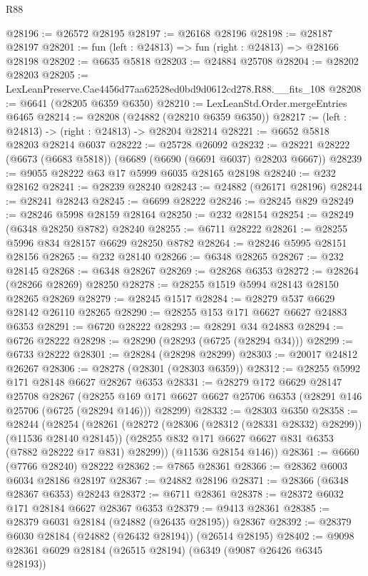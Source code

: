 \begin{lexlean}{R88}
\begin{coremodule}
@28196 := @26572 @28195
@28197 := @26168 @28196
@28198 := @28187 @28197
@28201 := fun (left : @24813) => fun (right : @24813) => @28166 @28198
@28202 := @6635 @5818
@28203 := @24884 @25708
@28204 := @28202 @28203
@28205 := LexLeanPreserve.Cae4456d77aa62528ed0bd9d0612cd278.R88.__fits_108
@28208 := @6641 (@28205 @6359 @6350)
@28210 := LexLeanStd.Order.mergeEntries @6465
@28214 := @28208 (@24882 (@28210 @6359 @6350))
@28217 := (left : @24813) -> (right : @24813) -> @28204 @28214
@28221 := @6652 @5818 @28203 @28214 @6037
@28222 := @25728 @26092
@28232 := @28221 @28222 (@6673 (@6683 @5818)) (@6689 (@6690 (@6691 @6037) @28203 @6667))
@28239 := @9055 @28222 @63 @17 @5999 @6035 @28165 @28198
@28240 := @232 @28162
@28241 := @28239 @28240
@28243 := @24882 (@26171 @28196)
@28244 := @28241 @28243
@28245 := @6699 @28222
@28246 := @28245 @829
@28249 := @28246 @5998 @28159 @28164
@28250 := @232 @28154
@28254 := @28249 (@6348 @28250 @8782) @28240
@28255 := @6711 @28222
@28261 := @28255 @5996 @834 @28157 @6629 @28250 @8782
@28264 := @28246 @5995 @28151 @28156
@28265 := @232 @28140
@28266 := @6348 @28265
@28267 := @232 @28145
@28268 := @6348 @28267
@28269 := @28268 @6353
@28272 := @28264 (@28266 @28269) @28250
@28278 := @28255 @1519 @5994 @28143 @28150 @28265 @28269
@28279 := @28245 @1517
@28284 := @28279 @537 @6629 @28142 @26110 @28265
@28290 := @28255 @153 @171 @6627 @6627 @24883 @6353
@28291 := @6720 @28222
@28293 := @28291 @34 @24883
@28294 := @6726 @28222
@28298 := @28290 (@28293 (@6725 (@28294 @34)))
@28299 := @6733 @28222
@28301 := @28284 (@28298 @28299)
@28303 := @20017 @24812 @26267
@28306 := @28278 (@28301 (@28303 @6359))
@28312 := @28255 @5992 @171 @28148 @6627 @28267 @6353
@28331 := @28279
    @172
    @6629
    @28147
    @25708
    @28267
    (@28255 @169 @171 @6627 @6627 @25706 @6353 (@28291 @146 @25706 (@6725 (@28294 @146))) @28299)
@28332 := @28303 @6350
@28358 := @28244
    (@28254
      (@28261
        (@28272 (@28306 (@28312 (@28331 @28332) @28299)) (@11536 @28140 @28145))
        (@28255 @832 @171 @6627 @6627 @831 @6353 (@7882 @28222 @17 @831) @28299))
      (@11536 @28154 @146))
@28361 := @6660 (@7766 @28240) @28222
@28362 := @7865 @28361
@28366 := @28362 @6003 @6034 @28186 @28197
@28367 := @24882 @28196
@28371 := @28366 (@6348 @28367 @6353) @28243
@28372 := @6711 @28361
@28378 := @28372 @6032 @171 @28184 @6627 @28367 @6353
@28379 := @9413 @28361
@28385 := @28379 @6031 @28184 (@24882 (@26435 @28195)) @28367
@28392 := @28379 @6030 @28184 (@24882 (@26432 @28194)) (@26514 @28195)
@28402 := @9098 @28361 @6029 @28184 (@26515 @28194) (@6349 (@9087 @26426 @6345 @28193))

\end{coremodule}
\end{lexlean}
